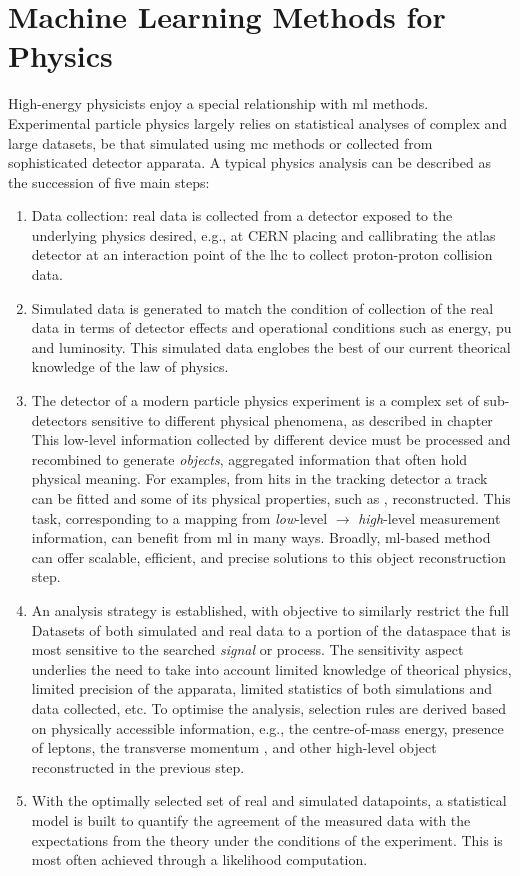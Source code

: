 \section{Machine Learning Methods for Physics}
High-energy physicists enjoy a special relationship with \gls{ml} methods. Experimental particle physics largely relies on statistical analyses of complex and large datasets, be that simulated using \gls{mc} methods or collected from sophisticated detector apparata. A typical physics analysis can be described as the succession of five main steps:
\begin{enumerate}
    \item Data collection: real data is collected from a detector exposed to the underlying physics desired, e.g., at CERN placing and callibrating the \gls{atlas} detector at an interaction point of the \gls{lhc} to collect proton-proton collision data. 
    \item Simulated data is generated to match the condition of collection of the real data in terms of detector effects and operational conditions such as energy, \gls{pu} and luminosity. This simulated data englobes the best of our current theorical knowledge of the law of physics. 
    \item The detector of a modern particle physics experiment is a complex set of sub-detectors sensitive to different physical phenomena, as described in chapter %
    This low-level information collected by different device must be processed and recombined to generate \textit{objects}, aggregated information that often hold physical meaning. For examples, from hits in the tracking detector a track can be fitted and some of its physical properties, such as \pt, reconstructed. This task, corresponding to a mapping from \textit{low}-level $\rightarrow$ \textit{high}-level measurement information, can benefit from \gls{ml} in many ways. Broadly, \gls{ml}-based method can offer scalable, efficient, and precise solutions to this object reconstruction step. 
    \item An analysis strategy is established, with objective to similarly restrict the full Datasets of both simulated and real data to a portion of the dataspace that is most sensitive to the searched \textit{signal} or process. The sensitivity aspect underlies the need to take into account limited knowledge of theorical physics, limited precision of the apparata, limited statistics of both simulations and data collected, etc. To optimise the analysis, selection rules are derived based on physically accessible information, e.g., the centre-of-mass energy, presence of leptons, the transverse momentum \pt, and other high-level object reconstructed in the previous step.
    \item With the optimally selected set of real and simulated datapoints, a statistical model is built to quantify the agreement of the measured data with the expectations from the theory under the conditions of the experiment. This is most often achieved through a likelihood computation.
\end{enumerate}

